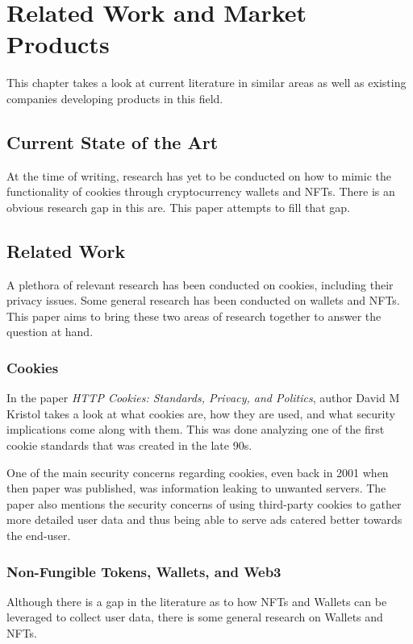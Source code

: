 \chapter{Related Work and Market Products}
\label{ch:SOTA}
This chapter takes a look at current literature in similar areas as well as existing companies developing products in this field.

%
%
\section{Current State of the Art}
\label{sec:sota:stateOfTheArt}
At the time of writing, research has yet to be conducted on how to mimic the functionality of cookies through cryptocurrency wallets and NFTs. There is an obvious research gap in this are. This paper attempts to fill that gap.

%
%
\section{Related Work}
\label{sec:sota:relatedWork}
A plethora of relevant research has been conducted on cookies, including their privacy issues. Some general research has been conducted on wallets and NFTs. This paper aims to bring these two areas of research together to answer the question at hand.

\subsection{Cookies}
\label{sec:sota:cookies}
In the paper \textit{HTTP Cookies: Standards, Privacy, and Politics}, author David M Kristol takes a look at what cookies are, how they are used, and what security implications come along with them. This was done analyzing one of the first cookie standards that was created in the late 90s. \cite{cookies1}

One of the main security concerns regarding cookies, even back in 2001 when then paper was published, was information leaking to unwanted servers. The paper also mentions the security concerns of using third-party cookies to gather more detailed user data and thus being able to serve ads catered better towards the end-user. \cite{cookies1}

\subsection{Non-Fungible Tokens, Wallets, and Web3}
\label{sec:sota:nfts}
Although there is a gap in the literature as to how NFTs and Wallets can be leveraged to collect user data, there is some general research on Wallets and NFTs.

